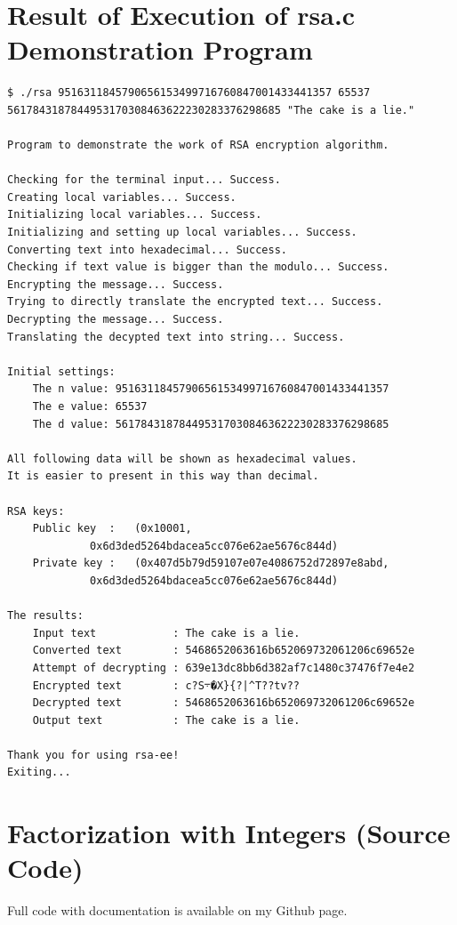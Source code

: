 \documentclass[a4paper, 12pt]{article}
\begin{document}
\newpage

\section{Result of Execution of rsa.c Demonstration Program}
\label{result}
\begin{lstlisting}[caption=Output from the Execution of rsa.c]
$ ./rsa 9516311845790656153499716760847001433441357 65537 5617843187844953170308463622230283376298685 "The cake is a lie."

Program to demonstrate the work of RSA encryption algorithm.

Checking for the terminal input... Success.
Creating local variables... Success.
Initializing local variables... Success.
Initializing and setting up local variables... Success.
Converting text into hexadecimal... Success.
Checking if text value is bigger than the modulo... Success.
Encrypting the message... Success.
Trying to directly translate the encrypted text... Success.
Decrypting the message... Success.
Translating the decypted text into string... Success.

Initial settings:
	The n value: 9516311845790656153499716760847001433441357
	The e value: 65537
	The d value: 5617843187844953170308463622230283376298685

All following data will be shown as hexadecimal values.
It is easier to present in this way than decimal.

RSA keys:
	Public key  :   (0x10001, 
			 0x6d3ded5264bdacea5cc076e62ae5676c844d)
	Private key :   (0x407d5b79d59107e07e4086752d72897e8abd, 
			 0x6d3ded5264bdacea5cc076e62ae5676c844d)

The results:
	Input text            : The cake is a lie.
	Converted text        : 5468652063616b652069732061206c69652e
	Attempt of decrypting : 639e13dc8bb6d382af7c1480c37476f7e4e2
	Encrypted text        : c?S܋�X}{?|^T??tv??
	Decrypted text        : 5468652063616b652069732061206c69652e
	Output text           : The cake is a lie.

Thank you for using rsa-ee!
Exiting...

\end{lstlisting}

\newpage
\section{Factorization with Integers (Source Code)}
\label{fullbrute}
Full code with documentation is available on my Github page.\cite{github}\\
\end{document}
